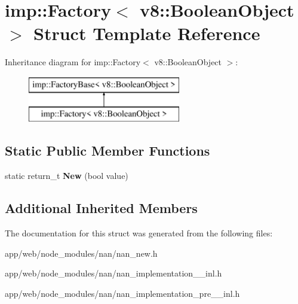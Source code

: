 \hypertarget{structimp_1_1_factory_3_01v8_1_1_boolean_object_01_4}{}\section{imp\+:\+:Factory$<$ v8\+:\+:Boolean\+Object $>$ Struct Template Reference}
\label{structimp_1_1_factory_3_01v8_1_1_boolean_object_01_4}
Inheritance diagram for imp\+:\+:Factory$<$ v8\+:\+:Boolean\+Object $>$\+:\begin{figure}[H]
\begin{center}
\leavevmode
\includegraphics[height=2.000000cm]{structimp_1_1_factory_3_01v8_1_1_boolean_object_01_4}
\end{center}
\end{figure}
\subsection*{Static Public Member Functions}
\begin{DoxyCompactItemize}
\item 
\mbox{\label{structimp_1_1_factory_3_01v8_1_1_boolean_object_01_4_a9238f1319906bb9c325ccdb428d9ea5d}} 
static return\+\_\+t {\bfseries New} (bool value)
\end{DoxyCompactItemize}
\subsection*{Additional Inherited Members}


The documentation for this struct was generated from the following files\+:\begin{DoxyCompactItemize}
\item 
app/web/node\+\_\+modules/nan/nan\+\_\+new.\+h\item 
app/web/node\+\_\+modules/nan/nan\+\_\+implementation\+\_\+\_\+inl.\+h\item 
app/web/node\+\_\+modules/nan/nan\+\_\+implementation\+\_\+pre\+\_\+\_\+inl.\+h\end{DoxyCompactItemize}

